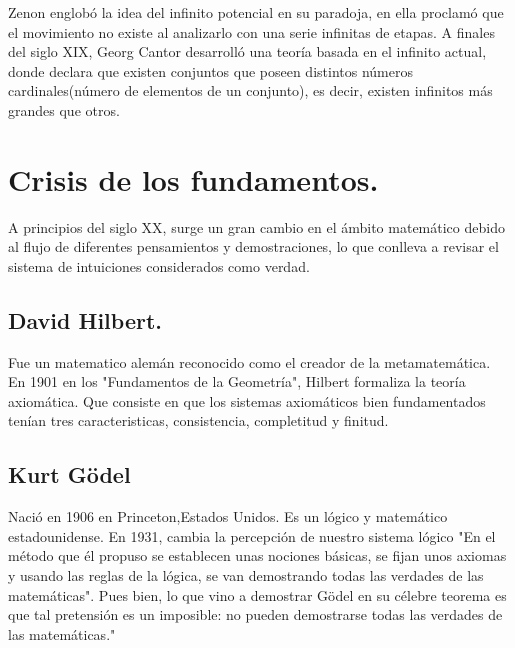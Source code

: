 \documentclass[letterpaper, 12 pt, conference]{ieeeconf}  %
\begin{document}
Zenon englobó la idea del infinito potencial en su paradoja, en ella proclamó que el movimiento no existe al analizarlo con una serie infinitas de etapas.
A finales del siglo XIX, Georg Cantor desarrolló una teoría basada en el infinito actual, donde declara que existen conjuntos que poseen distintos números cardinales(número de elementos de un conjunto), es decir, existen infinitos más grandes que otros.



\section{Crisis de los fundamentos. }

A principios del siglo XX, surge un gran cambio en el ámbito matemático debido al flujo de diferentes pensamientos y demostraciones, lo que conlleva a revisar el sistema de intuiciones considerados como verdad. 

\subsection{David Hilbert.} 

Fue un matematico alemán  reconocido como el creador de la metamatemática.
En 1901 en los "Fundamentos de la Geometría", Hilbert formaliza la teoría axiomática. Que consiste en que los sistemas axiomáticos bien fundamentados tenían tres caracteristicas, consistencia, completitud y finitud.

\subsection{Kurt Gödel}
Nació en 1906 en Princeton,Estados Unidos. Es un lógico y matemático estadounidense. En 1931, cambia la percepción de nuestro sistema lógico "En el método que él propuso se establecen unas nociones básicas, se fijan unos axiomas y usando las reglas de la lógica, se van demostrando todas las verdades de las matemáticas". Pues bien, lo que vino a demostrar Gödel en su célebre teorema es que tal pretensión es un imposible: no pueden demostrarse todas las verdades de las matemáticas."\newline


   \begin{figure}[]
      \centering
      \caption{}
      \label{}
   \end{figure}
\end{document}
